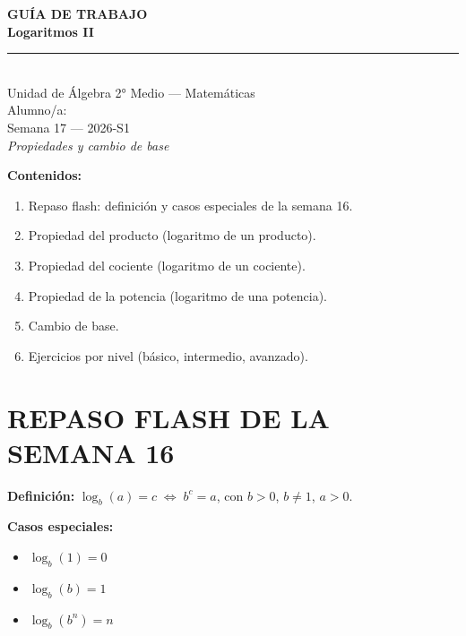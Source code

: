 \documentclass[11pt,a4paper]{article}
\newcommand{\guiaTitulo}{Logaritmos II}
\newcommand{\guiaSubtitulo}{Propiedades y cambio de base}
\newcommand{\guiaUnidad}{Unidad de Álgebra}
\newcommand{\guiaCurso}{2° Medio --- Matemáticas}
\newcommand{\guiaAlumno}{\underline{\hspace{6cm}}}
\newcommand{\guiaSemana}{Semana 17}
\newcommand{\guiaSemestre}{2026-S1}
\begin{document}
\thispagestyle{empty}
\vspace*{3cm}
\begin{center}
  {\Huge\bfseries\color{azulprincipal} GUÍA DE TRABAJO}\\[8pt]
  {\LARGE\bfseries\color{azuloscuro} \guiaTitulo}\\[15pt]
  {\color{azulprincipal}\rule{8cm}{2pt}}\\[15pt]
  {\Large \guiaUnidad{} \textbar{} \guiaCurso}\\[8pt]
  {\large Alumno/a: \guiaAlumno}\\[4pt]
  {\large \guiaSemana{} --- \guiaSemestre}\\[25pt]
  {\itshape\color{gray}
  \guiaSubtitulo}
\end{center}

\vspace{2cm}
\noindent\textbf{Contenidos:}
\begin{enumerate}[leftmargin=2cm]
  \item Repaso flash: definición y casos especiales de la semana 16.
  \item Propiedad del producto (logaritmo de un producto).
  \item Propiedad del cociente (logaritmo de un cociente).
  \item Propiedad de la potencia (logaritmo de una potencia).
  \item Cambio de base.
  \item Ejercicios por nivel (básico, intermedio, avanzado).
\end{enumerate}
\newpage

\section{REPASO FLASH DE LA SEMANA 16}

\begin{tcolorbox}[recuerda]
\textbf{Definición:} $\log_b(a) = c \;\iff\; b^{c} = a$, con $b > 0$, $b \ne 1$, $a > 0$.

\medskip
\textbf{Casos especiales:}
\begin{itemize}[nosep]
  \item $\log_b(1) = 0$
  \item $\log_b(b) = 1$
  \item $\log_b(b^{n}) = n$
\end{itemize}
\end{tcolorbox}
\end{document}
